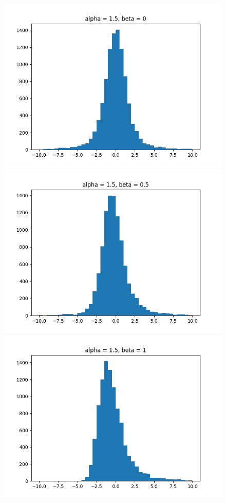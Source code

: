 \documentclass[11pt, twocolumn]{article}
\begin{document}
\begin{figure}[h]
\begin{minipage}{0.2\textwidth}
        \includegraphics[width=\textwidth]{q4_1_a1.5_b0}
    \end{minipage}%
    \begin{minipage}{0.2\textwidth}
        \centering
        \includegraphics[width=\textwidth]{q4_1_a1.5_b0.5}
    \end{minipage}%
    \begin{minipage}{0.2\textwidth}
        \centering
        \includegraphics[width=\textwidth]{q4_1_a1.5_b1}

\end{minipage}
\end{figure}
\end{document}
